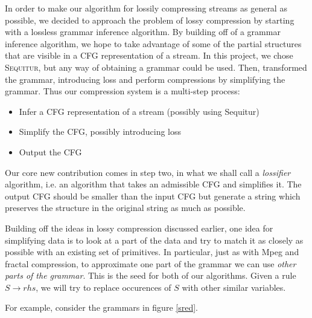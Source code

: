 \documentclass[11pt]{article}
\newcommand{\Sequitur}{\textsc{Sequitur}\xspace}
\begin{document}
In order to make our algorithm for lossily compressing streams
as general as possible, we decided
to approach the problem of lossy compression by starting with a lossless
grammar inference algorithm. 
By building off of a grammar inference algorithm, we
hope to take advantage of some of the partial structures
that are visible in a CFG representation of a stream. 
In this project, we chose \Sequitur, but
any way of obtaining a grammar could be used. Then, transformed
the grammar, introducing loss and perform compressions by simplifying
the grammar. Thus our compression system is a multi-step process:

\begin{itemize}
\item Infer a CFG representation of a stream (possibly using Sequitur)
\item Simplify the CFG, possibly introducing loss
\item Output the CFG
\end{itemize}


Our core new contribution comes in step two, in what we shall call a \emph{lossifier} 
algorithm, i.e. an algorithm that takes
an admissible CFG and simplifies it. The output CFG should be smaller
than the input CFG but generate a string which preserves the
structure in the original string as much as possible. 

Building off the ideas in lossy compression discussed
earlier, one idea for simplifying data is to look at a part
of the data and try to match it as closely as possible with an
existing set of primitives. In particular, just as with Mpeg and
fractal compression, to approximate one part of the grammar
we can use \emph{other parts of the grammar}. This is the seed for
both of our algorithms. Given a rule $S \rightarrow rhs$, we will
try to replace occurences of $S$ with other similar variables.

For example, consider the grammars in figure \ref{sred}.
\end{document}
